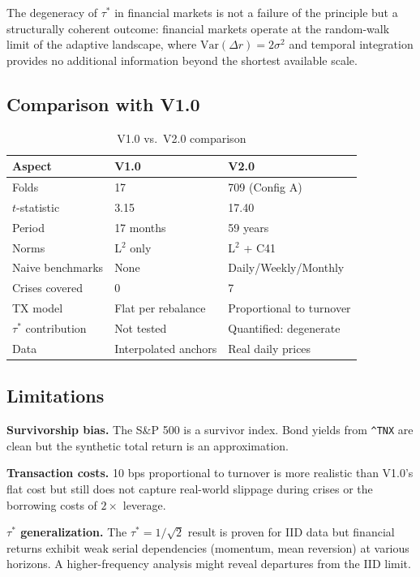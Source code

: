 \documentclass[11pt,a4paper]{article}
\begin{document}
The degeneracy of $\tau^*$ in financial markets is not a failure of the principle but a structurally coherent outcome: financial markets operate at the random-walk limit of the adaptive landscape, where $\mathrm{Var}(\Delta r) = 2\sigma^2$ and temporal integration provides no additional information beyond the shortest available scale.

\subsection{Comparison with V1.0}

\begin{table}[H]
\centering
\caption{V1.0 vs.\ V2.0 comparison}
\label{tab:comparison}
\begin{tabular}{lll}
\toprule
Aspect & V1.0 & V2.0 \\
\midrule
Folds & 17 & 709 (Config A) \\
$t$-statistic & 3.15 & 17.40 \\
Period & 17 months & 59 years \\
Norms & L$^2$ only & L$^2$ + C41 \\
Naive benchmarks & None & Daily/Weekly/Monthly \\
Crises covered & 0 & 7 \\
TX model & Flat per rebalance & Proportional to turnover \\
$\tau^*$ contribution & Not tested & Quantified: degenerate \\
Data & Interpolated anchors & Real daily prices \\
\bottomrule
\end{tabular}
\end{table}

\subsection{Limitations}

\textbf{Survivorship bias.} The S\&P 500 is a survivor index. Bond yields from \texttt{\^{}TNX} are clean but the synthetic total return is an approximation.

\textbf{Transaction costs.} 10 bps proportional to turnover is more realistic than V1.0's flat cost but still does not capture real-world slippage during crises or the borrowing costs of $2\times$ leverage.

\textbf{$\tau^*$ generalization.} The $\tau^* = 1/\sqrt{2}$ result is proven for IID data but financial returns exhibit weak serial dependencies (momentum, mean reversion) at various horizons. A higher-frequency analysis might reveal departures from the IID limit.
\end{document}
